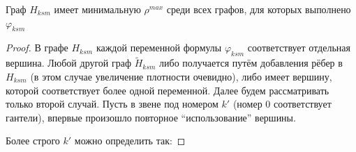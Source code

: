 \begin{Lem} 
\label{lem:min_ro_Hksm}
Граф $H_{ksm}$ имеет минимальную $\rho^{max}$ среди всех графов, для которых выполнено $\varphi_{ksm}$
\end{Lem}

\begin{proof}
В графе $H_{ksm}$ каждой переменной формулы $\varphi_{ksm}$ соответствует отдельная вершина.
Любой другой граф $\tilde H_{ksm}$ либо получается путём добавления рёбер в $H_{ksm}$ (в этом случае увеличение плотности очевидно), либо имеет вершину, которой соответствует более одной переменной.
Далее будем рассматривать только второй случай.
Пусть в звене под номером $k'$ (номер $0$ соответствует гантели), впервые произошло повторное ``использование'' вершины. 

Более строго $k'$ можно определить так:


\end{proof}

